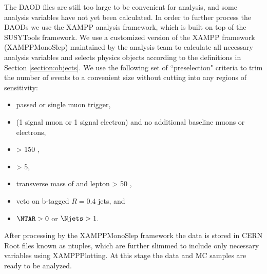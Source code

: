 The DAOD files are still too large to be convenient for analysis, and some analysis variables have not yet been calculated. In order to further process the DAODs we use the XAMPP analysis framework, which is built on top of the SUSYTools framework. We use a customized version of the XAMPP framework (XAMPPMonoSlep) maintained by the analysis team to calculate all necessary analysis variables and selects physics objects according to the definitions in Section \ref{section:objects}. We use the following set of ``preselection" criteria to trim the number of events to a convenient size without cutting into any regions of sensitivity:
\begin{itemize}
\item passed \met or single muon trigger,
\item (1 signal muon or 1 signal electron) and no additional baseline muons or electrons,
\item \met > 150 \GeV,
\item \metsig > 5,
\item transverse mass of \met and lepton \mtlepmet > 50 \GeV,
\item veto on b-tagged $R=0.4$ jets, and
\item \(\NTAR > 0\) or \(\Njets > 1\).
\end{itemize}

After processing by the XAMPPMonoSlep framework the data is stored in CERN Root files known as ntuples, which are further slimmed to include only necessary variables using XAMPPPlotting. At this stage the data and MC samples are ready to be analyzed.
